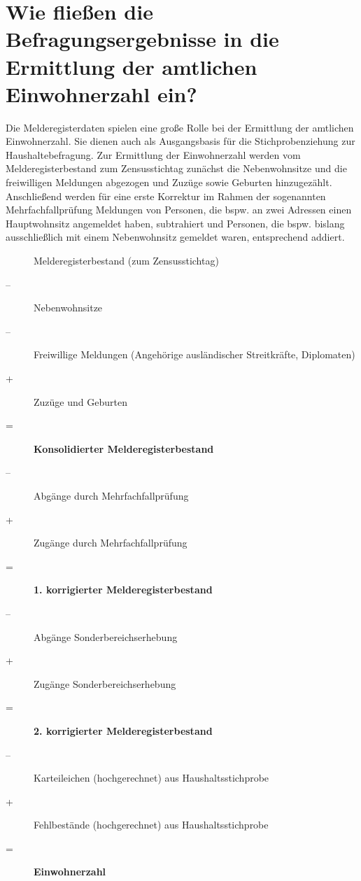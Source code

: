 \section{Wie fließen die Befragungsergebnisse in die Ermittlung der amtlichen Einwohnerzahl ein?}
Die Melderegisterdaten spielen eine große Rolle bei der Ermittlung der amtlichen Einwohnerzahl. Sie dienen auch als Ausgangsbasis für die Stichprobenziehung zur Haushaltebefragung. Zur Ermittlung der Einwohnerzahl werden vom Melderegisterbestand zum Zensusstichtag zunächst die Nebenwohnsitze und die freiwilligen Meldungen abgezogen und Zuzüge sowie Geburten hinzugezählt. Anschließend werden für eine erste Korrektur im Rahmen der sogenannten Mehrfachfallprüfung Meldungen von Personen, die bspw. an zwei Adressen einen Hauptwohnsitz angemeldet haben, subtrahiert und Personen, die bspw. bislang ausschließlich mit einem Nebenwohnsitz gemeldet waren, entsprechend addiert.

\setlength{\parskip}{1pt}
\begin{description}
    \item[]Melderegisterbestand (zum Zensusstichtag)
    \item[--]Nebenwohnsitze
    \item[--]Freiwillige Meldungen (Angehörige ausländischer Streitkräfte, Diplomaten)
    \item[+]Zuzüge und Geburten
    \item[=]\textbf{Konsolidierter Melderegisterbestand}
    \item[--]Abgänge durch Mehrfachfallprüfung
    \item[+]Zugänge durch Mehrfachfallprüfung
    \item[=]\textbf{1. korrigierter Melderegisterbestand}
    \item[--]Abgänge Sonderbereichserhebung
    \item[+]Zugänge Sonderbereichserhebung
    \item[=]\textbf{2. korrigierter Melderegisterbestand}
    \item[--]Karteileichen (hochgerechnet) aus Haushaltsstichprobe
    \item[+]Fehlbestände (hochgerechnet) aus Haushaltsstichprobe
    \item[=]\textbf{Einwohnerzahl}
\end{description}
\setlength{\parskip}{\baselineskip}

